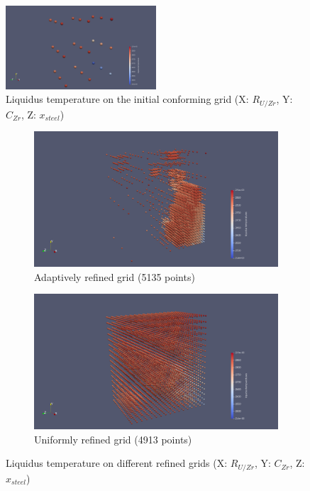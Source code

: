 \documentclass[11pt]{article}\usepackage{geometry} \geometry{letterpaper, margin=25.4mm}
\begin{document}
\begin{figure}[H]
\centering
 \centering \includegraphics[width=0.5\textwidth]{figures/CalphadBasedEOSTest/TabulatedBases/Tab0.png} 
\caption{{Liquidus temperature on the initial conforming grid (X: $R_{U/Zr}$, Y: $C_{Zr}$, Z: $x_{steel}$})} \label{fig:Tab0} 
\end{figure}
\begin{figure}[H]
\centering
\begin{subfigure}[t]{0.48\textwidth}
 \centering \includegraphics[width=\textwidth]{figures/CalphadBasedEOSTest/TabulatedBases/TabOpt4_c5.png}
\caption{Adaptively refined grid (5135 points)} \label{fig:TabOptRefined} 
\end{subfigure}

\begin{subfigure}[t]{0.48\textwidth}
 \centering \includegraphics[width=\textwidth]{figures/CalphadBasedEOSTest/TabulatedBases/Tab2_inter2.png}
\caption{Uniformly refined grid (4913 points)} \label{fig:TabRowRefined} 
\end{subfigure}
\caption{Liquidus temperature on different refined grids (X: $R_{U/Zr}$, Y: $C_{Zr}$, Z: $x_{steel}$)}
\end{figure}
\end{document}

